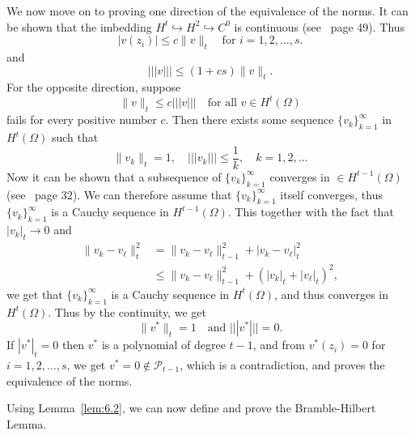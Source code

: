 \begin{bev}
We now move on to proving one direction of the equivalence of the norms. 
It can be shown that the imbedding $H^t\hookrightarrow H^2 \hookrightarrow C^0$ is continuous (see~\cite{Braess} page 49). Thus
\begin{equation*}
    |v(z_i)|\leq c\|v\|_t\quad \text{for } i=1,2,\ldots,s.
\end{equation*} 
and
\begin{equation*}
    |||v|||\leq (1+cs)\|v\|_t.
\end{equation*}
For the opposite direction, suppose 
\begin{equation*}
    \|v\|_t\leq c|||v|||\quad \text{for all } v\in H^t(\Omega)
\end{equation*}
fails for every positive number $c$. Then there exists some sequence $\{v_k\}_{k=1}^\infty$ in $H^t(\Omega)$ such that
\begin{equation*}
    \|v_k\|_t=1,\quad |||v_k|||\leq \frac{1}{k},\quad k=1,2,\ldots
\end{equation*}
Now it can be shown that a subsequence of $\{v_k\}_{k=1}^\infty$ converges in $\in H^{t-1}(\Omega)$ (see~\cite{Braess} page 32). We can therefore assume that $\{v_k\}_{k=1}^\infty$ itself converges, thus $\{v_k\}_{k=1}^\infty$ is a Cauchy sequence in $H^{t-1}(\Omega)$.
This together with the fact that $|v_k|_t\to 0$ and
\begin{align*}
    \|v_k-v_\ell\|_t^2 &= \|v_k-v_\ell\|_{t-1}^2 + |v_k-v_\ell|_t^2 \\
    & \leq\|v_k-v_\ell\|_{t-1}^2 + {(|v_k|_t + |v_\ell|_t)}^2 ,
\end{align*}
 we get that $\{v_k\}_{k=1}^\infty$ is a Cauchy sequence in $H^t(\Omega)$, and thus converges in $H^t(\Omega)$.
Thus by the continuity, we get 
\begin{equation}
    \|v^*\|_t = 1\quad \text{and }|||v^*|||=0. 
\end{equation}
If $|v^*|_t = 0$ then $v^*$ is a polynomial of degree $t-1$, and from $v^*(z_i)=0$ for $i=1,2,\ldots,s$, we get $v^*=0\notin \mathcal{P}_{t-1}$,
which is a contradiction, and proves the equivalence of the norms.
\end{bev}

Using Lemma~\ref{lem:6.2}, we can now define and prove the Bramble-Hilbert Lemma.

